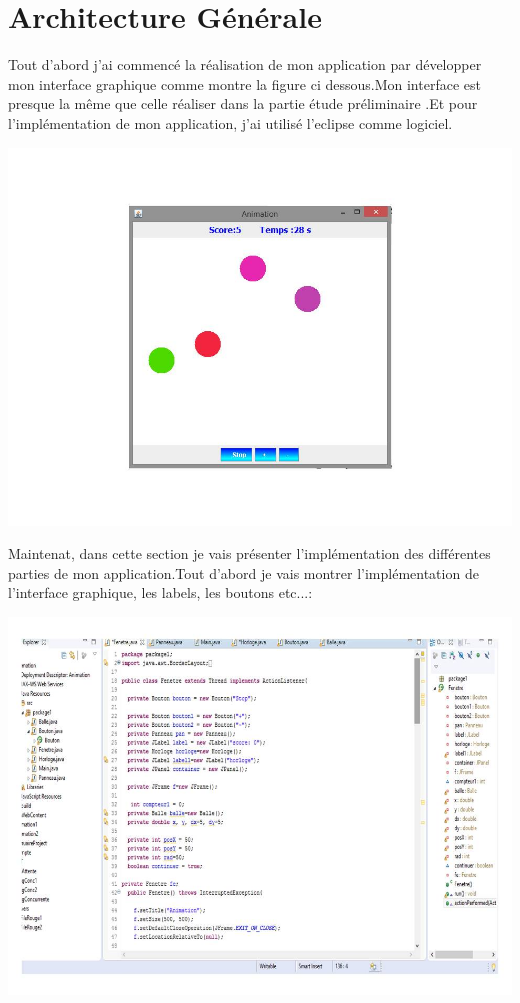 \documentclass{article}
\begin{document}
\section{Architecture Générale}
Tout d'abord j'ai commencé la réalisation de mon application par développer mon interface graphique comme montre la figure ci dessous.Mon interface est presque la même que celle réaliser dans la partie étude préliminaire .Et pour l'implémentation de mon application, j'ai utilisé l'eclipse comme logiciel.
\begin{center}
  \includegraphics[scale=0.5]{Diapo1.JPG}
\end{center}
Maintenat, dans cette section je vais présenter l'implémentation des différentes parties de mon application.Tout d'abord je vais montrer l'implémentation de l'interface graphique, les labels, les boutons etc...:
\begin{center}
  \includegraphics[scale=0.5]{kk.JPG}
\end{center}
\end{document}
